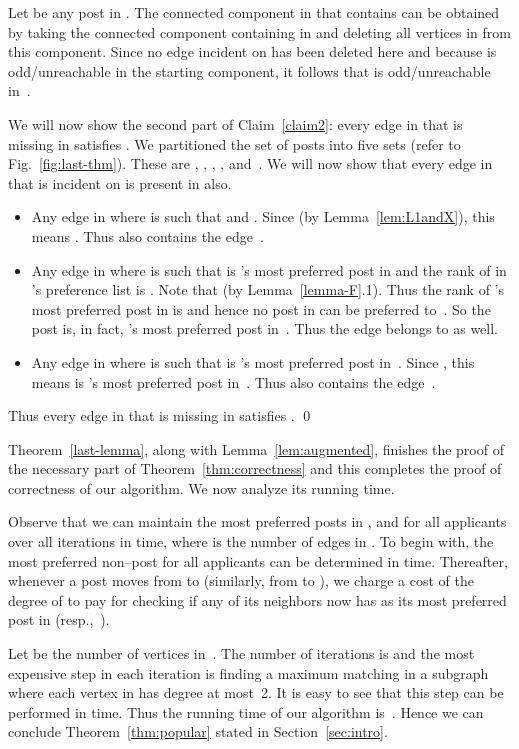 \documentclass[11pt]{llncs}
\begin{document}
Let  be any post in . The connected component in  that 
contains  can be obtained by taking the connected component containing  in  and 
deleting all vertices in  from this component. Since no edge incident on 
 has been deleted here and because  is odd/unreachable in the starting component, it 
follows that  is odd/unreachable in~.

\smallskip

We will now show the second part of Claim~\ref{claim2}: every edge  in  that is 
missing in  satisfies .
We partitioned the set  of posts into five sets (refer to Fig.~\ref{fig:last-thm}). These are 
, , , , and~. We will now show that every 
edge in  that is incident on  is present in  also.
\begin{itemize}
\item Any edge  in  where  is such that  and .
Since  (by Lemma~\ref{lem:L1andX}), this means . Thus  also contains the edge~.
\item Any edge  in  where  is such that  is 's most preferred post in  and
the rank of  in 's preference list is . Note that  
(by Lemma~\ref{lemma-F}.1). Thus the rank of 's most preferred post in  is  and hence no post in 
 can be preferred to~. So the post  is, in fact, 's most preferred post in~. Thus the edge  
belongs to  as well. 
\item Any edge  in  where  is such that  is 's most preferred post in~.
Since , this means  is 's most preferred post in~. Thus  also contains the edge~. 
\end{itemize}
Thus every edge  in  that is missing in  satisfies 
. \qed

\medskip

Theorem~\ref{last-lemma}, along with Lemma~\ref{lem:augmented}, finishes the proof of the 
necessary part of Theorem~\ref{thm:correctness} and this completes 
the proof of correctness of our algorithm. We now analyze its running time.

Observe that we can maintain the most preferred posts in , and  for all 
applicants over all iterations in  time, where  is the number of edges in . 
To begin with, the most preferred non--post for all applicants can be determined in  time. Thereafter, whenever a post  moves from  to  (similarly, from  to ), we charge  a cost of the degree of  to pay for checking if any of its neighbors now has  as its most preferred post in  (resp.,~). 

Let  be the number of vertices in~. The number of iterations is  and 
the most expensive step in each iteration is finding a maximum matching in a subgraph where 
each vertex in  has degree at most~2. It is easy to see that this step can
be performed in  time. Thus the running time of our algorithm is~.
Hence we can conclude Theorem~\ref{thm:popular} stated in Section~\ref{sec:intro}.
\end{document}

